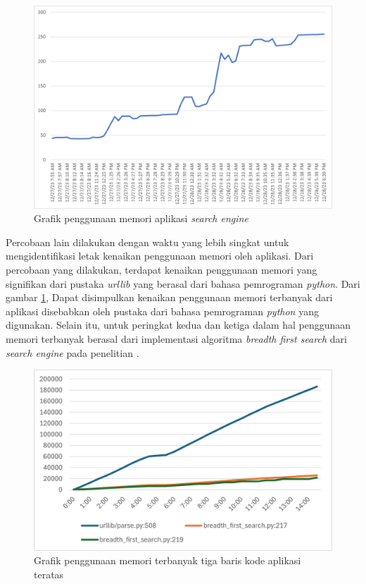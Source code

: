 \documentclass[
	a4paper, %
	10pt, %
	unnumberedsections, %
	twoside, %
]{LTJournalArticle}
\begin{document}
\begin{figure}[H]
	\includegraphics[width=\linewidth]{memchart.png}
	\caption{Grafik penggunaan memori aplikasi \textit{search engine}}
\end{figure}


Percobaan lain dilakukan dengan waktu yang lebih singkat untuk mengidentifikasi letak kenaikan penggunaan memori oleh aplikasi. Dari percobaan yang dilakukan, terdapat kenaikan penggunaan memori yang signifikan dari pustaka \textit{urllib} yang berasal dari bahasa pemrograman \textit{python}. Dari gambar \ref{gambar:linemem}, Dapat disimpulkan kenaikan penggunaan memori terbanyak dari aplikasi disebabkan oleh pustaka dari bahasa pemrograman \textit{python} yang digunakan. Selain itu, untuk peringkat kedua dan ketiga dalam hal penggunaan memori terbanyak berasal dari implementasi algoritma \textit{breadth first search} dari \textit{search engine} pada penelitian \cite{lazu}.

\begin{figure}[H]
	\includegraphics[width=\linewidth]{line_memusage_chart.png}
	\caption{Grafik penggunaan memori terbanyak tiga baris kode aplikasi teratas}
	\label{gambar:linemem}
\end{figure}
\end{document}
